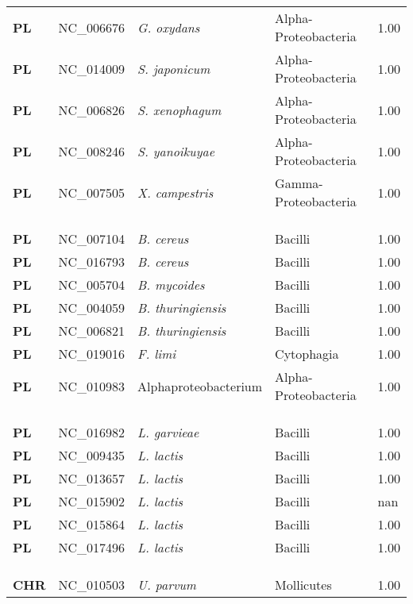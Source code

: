 \begin{adjustwidth}{-3cm}{2cm}
{\begin{supertabular}{>{\bfseries}l|p{0.1\textwidth}p{0.14\textwidth}l|l}
PL & NC\_006676 &  \textit{G. oxydans} & Alpha-Proteobacteria & 1.00\\
PL & NC\_014009 &  \textit{S. japonicum} & Alpha-Proteobacteria & 1.00\\
PL & NC\_006826 &  \textit{S. xenophagum} & Alpha-Proteobacteria & 1.00\\
PL & NC\_008246 &  \textit{S. yanoikuyae} & Alpha-Proteobacteria & 1.00\\
PL & NC\_007505 &  \textit{X. campestris} & Gamma-Proteobacteria & 1.00\\
\\
\\
\hline\\
PL & NC\_007104 & \textit{B. cereus} & Bacilli & 1.00\\
PL & NC\_016793 & \textit{B. cereus} & Bacilli & 1.00\\
PL & NC\_005704 & \textit{B. mycoides} & Bacilli & 1.00\\
PL & NC\_004059 & \textit{B. thuringiensis} & Bacilli & 1.00\\
PL & NC\_006821 & \textit{B. thuringiensis} & Bacilli & 1.00\\
PL & NC\_019016 & \textit{F. limi} & Cytophagia & 1.00\\
PL & NC\_010983 & Alphaproteobacterium & Alpha-Proteobacteria & 1.00\\
\\
\\
\hline\\
PL & NC\_016982 & \textit{L. garvieae} & Bacilli & 1.00\\
PL & NC\_009435 & \textit{L. lactis} & Bacilli & 1.00\\
PL & NC\_013657 & \textit{L. lactis} & Bacilli & 1.00\\
PL & NC\_015902 & \textit{L. lactis} & Bacilli & nan\\
PL & NC\_015864 & \textit{L. lactis} & Bacilli & 1.00\\
PL & NC\_017496 & \textit{L. lactis} & Bacilli & 1.00\\
\\
\\
\hline\\
CHR & NC\_010503 & \textit{U. parvum} & Mollicutes & 1.00\\

\end{supertabular}}
\end{adjustwidth}
